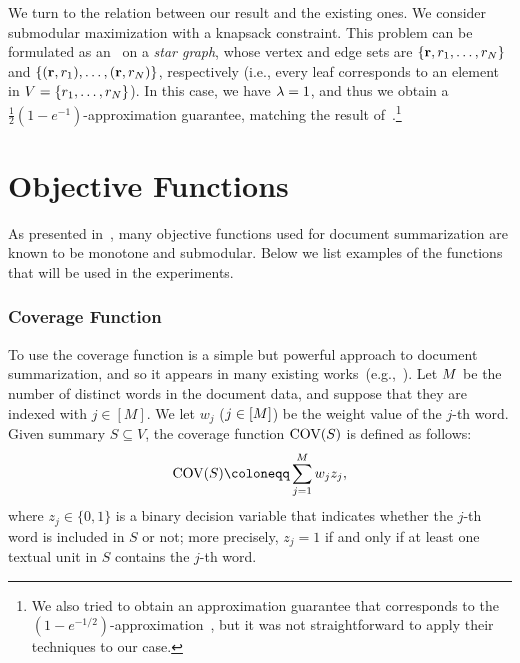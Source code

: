 \documentclass[11pt,a4paper]{article}
\begin{document}
	We turn to the relation between our result and the existing ones.  
	We consider 
	submodular maximization with a knapsack constraint. 
	This problem can be formulated as an \stkp\ 
	on a {\it star graph}, 
	whose vertex and edge sets are  
	$\{{\bf r},r_1,\dots,r_N\}$ and 
	$\{({\bf r},r_1),\dots,({\bf r},r_N)\}$, respectively  
	(i.e., every leaf corresponds to an element in $V=\{r_1,\dots,r_N\}$). 
	In this case, we have $\lambda=1$, 
	and thus we obtain 
	a $\frac{1}{2}(1-e^{-1})$-approximation guarantee, 
	matching the result  
	of~\cite{leskovec2007cost}.\footnote{
		We also tried to obtain an approximation guarantee that corresponds to 
		the $(1-e^{-1/2})$-approximation~\cite{khuller1999budgeted,lin2010multi}, 
		but it was not straightforward to 
		apply their techniques to our case.
	} 
	
	\section{Objective Functions}\label{section:objectives}
	As presented in~\cite{lin2011class}, 
	many objective functions used for document summarization 
	are known to be monotone and submodular. 
	Below we list examples of the functions that will be used in the experiments.  	
	
	\subsubsection*{Coverage Function} 
	To use
	the coverage function is a simple but powerful 
	approach to document summarization, 
	and so it appears in many existing 
	works~(e.g.,~\cite{filatova2004formal,takamura2009cover,berg2011jointly}).  
	Let $M$ be the number of distinct words in the document data, 
	and suppose that they are indexed with $j\in[M]$. 
	We let $w_j$ ($j\in[M]$) be the weight value of the $j$-th word. 
	Given summary $S\subseteq V$,  
	the coverage function $\text{COV}(S)$  
	is defined as follows: 
	\begin{align*}
		\cov(S)\coloneqq \sum_{j=1}^\J w_j z_j,
	\end{align*}
	where $z_j\in\{0,1\}$ is a binary decision variable 
	that indicates whether the $j$-th word is 
	included in $S$ or not; 
	more precisely, $z_j=1$ if and only if 
	at least one textual unit in $S$ 
	contains the $j$-th word. 
	
	
\end{document}
